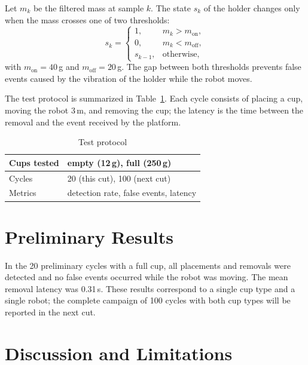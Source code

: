 \documentclass[lettersize,journal]{IEEEtran}
\begin{document}
Let $m_k$ be the filtered mass at sample $k$. The state $s_k$ of the holder changes only when the mass crosses one of two thresholds:
\begin{equation}
s_k=\begin{cases}
1, & m_k > m_{\mathrm{on}},\\
0, & m_k < m_{\mathrm{off}},\\
s_{k-1}, & \text{otherwise},
\end{cases}
\label{eq:rule}
\end{equation}
with $m_{\mathrm{on}}=40$\,g and $m_{\mathrm{off}}=20$\,g. The gap between both thresholds prevents false events caused by the vibration of the holder while the robot moves.

The test protocol is summarized in Table~\ref{tab:protocol}. Each cycle consists of placing a cup, moving the robot 3\,m, and removing the cup; the latency is the time between the removal and the event received by the platform.

\begin{table}[!t]
\caption{Test protocol}
\label{tab:protocol}
\centering
\begin{tabular}{|l|l|}
\hline
Cups tested & empty (12\,g), full (250\,g) \\
\hline
Cycles & 20 (this cut), 100 (next cut) \\
\hline
Metrics & detection rate, false events, latency \\
\hline
\end{tabular}
\end{table}

\section{Preliminary Results}
\label{sec:results}

In the 20 preliminary cycles with a full cup, all placements and removals were detected and no false events occurred while the robot was moving. The mean removal latency was 0.31\,s. These results correspond to a single cup type and a single robot; the complete campaign of 100 cycles with both cup types will be reported in the next cut.

\section{Discussion and Limitations}
\label{sec:discussion}
\end{document}
